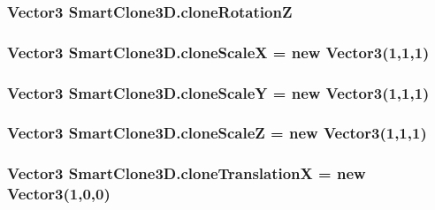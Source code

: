 \subsubsection[{\texorpdfstring{clone\+RotationZ}{cloneRotationZ}}]{\setlength{\rightskip}{0pt plus 5cm}Vector3 Smart\+Clone3\+D.\+clone\+RotationZ}\hypertarget{class_smart_clone3_d_a910674401d50bdcf427b977412950270}{}\label{class_smart_clone3_d_a910674401d50bdcf427b977412950270}
\subsubsection[{\texorpdfstring{clone\+ScaleX}{cloneScaleX}}]{\setlength{\rightskip}{0pt plus 5cm}Vector3 Smart\+Clone3\+D.\+clone\+ScaleX = new Vector3(1,1,1)}\hypertarget{class_smart_clone3_d_a1025089738ae8cb73b6981e24bc4b7d8}{}\label{class_smart_clone3_d_a1025089738ae8cb73b6981e24bc4b7d8}
\subsubsection[{\texorpdfstring{clone\+ScaleY}{cloneScaleY}}]{\setlength{\rightskip}{0pt plus 5cm}Vector3 Smart\+Clone3\+D.\+clone\+ScaleY = new Vector3(1,1,1)}\hypertarget{class_smart_clone3_d_ad6311a3c2aeb3dc0705d35a0d994eb34}{}\label{class_smart_clone3_d_ad6311a3c2aeb3dc0705d35a0d994eb34}
\subsubsection[{\texorpdfstring{clone\+ScaleZ}{cloneScaleZ}}]{\setlength{\rightskip}{0pt plus 5cm}Vector3 Smart\+Clone3\+D.\+clone\+ScaleZ = new Vector3(1,1,1)}\hypertarget{class_smart_clone3_d_ab221f63993ff0e945fca4788b52d4efa}{}\label{class_smart_clone3_d_ab221f63993ff0e945fca4788b52d4efa}
\subsubsection[{\texorpdfstring{clone\+TranslationX}{cloneTranslationX}}]{\setlength{\rightskip}{0pt plus 5cm}Vector3 Smart\+Clone3\+D.\+clone\+TranslationX = new Vector3(1,0,0)}\hypertarget{class_smart_clone3_d_af402e4cc65e9ea09b85721afefd45883}{}\label{class_smart_clone3_d_af402e4cc65e9ea09b85721afefd45883}
